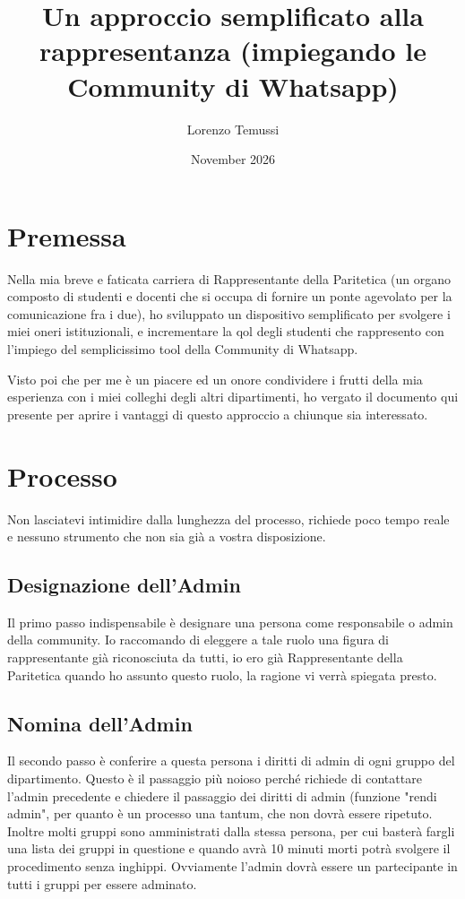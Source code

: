 \documentclass{article}
\title{Un approccio semplificato alla rappresentanza    
(impiegando le Community di Whatsapp)}
\author{Lorenzo Temussi}
\date{November 2026}
\begin{document}
\maketitle


\section{Premessa}
Nella mia breve e faticata carriera di Rappresentante della Paritetica (un organo composto di studenti e docenti che si occupa di fornire un ponte agevolato per la comunicazione fra i due), ho sviluppato un dispositivo semplificato per svolgere i miei oneri istituzionali, e incrementare la qol degli studenti che rappresento con l'impiego del semplicissimo tool della Community di Whatsapp.

Visto poi che per me è un piacere ed un onore condividere i frutti della mia esperienza con i miei colleghi degli altri dipartimenti, ho vergato il documento qui presente per aprire i vantaggi di questo approccio a chiunque sia interessato.

\section{Processo}
Non lasciatevi intimidire dalla lunghezza del processo, richiede poco tempo reale e nessuno strumento che non sia già a vostra disposizione.

\subsection{Designazione dell'Admin}

Il primo passo indispensabile è designare una persona come responsabile o admin della community. Io raccomando di eleggere a tale ruolo una figura di rappresentante già riconosciuta da tutti, io ero già Rappresentante della Paritetica quando ho assunto questo ruolo, la ragione vi verrà spiegata presto.

\subsection{Nomina dell'Admin}
Il secondo passo è conferire a questa persona i diritti di admin di ogni gruppo del dipartimento. Questo è il passaggio più noioso perché richiede di contattare l'admin precedente e chiedere il passaggio dei diritti di admin (funzione "rendi admin", per quanto è un processo una tantum, che non dovrà essere ripetuto. Inoltre molti gruppi sono amministrati dalla stessa persona, per cui basterà fargli una lista dei gruppi in questione e quando avrà 10 minuti morti potrà svolgere il procedimento senza inghippi. Ovviamente l'admin dovrà essere un partecipante in tutti i gruppi per essere adminato.
\end{document}
